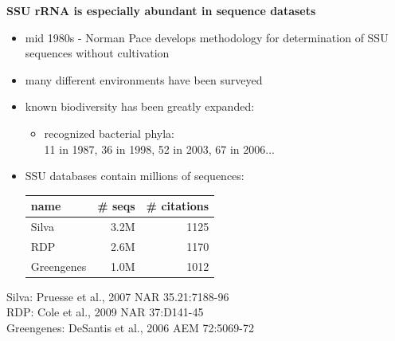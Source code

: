\documentclass[landscape]{slides}
\begin{document}
\begin{slide}
\begin{center}

\textbf{SSU rRNA is especially abundant in sequence datasets}
\end{center}
\medskip
\begin{minipage}{7in}
\small
\begin{itemize}
\item mid 1980s - Norman Pace develops methodology for determination
      of SSU sequences without cultivation
\item many different environments have been surveyed
\item known biodiversity has been greatly expanded:

\begin{itemize}
\item
  recognized bacterial phyla: \\
  11 in 1987, 36 in 1998, 52 in 2003, 67 in 2006...
\end{itemize}

\item SSU databases contain millions of sequences:
\begin{center}
\begin{tabular}{lrr}
  name & \# seqs & \# citations \\ \hline
  Silva & 3.2M & 1125 \\ 
  RDP   & 2.6M & 1170 \\
  Greengenes & 1.0M & 1012 \\
\end{tabular}
\end{center}
\end{itemize}

\tiny
Silva: Pruesse et al., 2007 NAR 35.21:7188-96 \\
RDP: Cole et al., 2009 NAR 37:D141-45 \\
Greengenes: DeSantis et al., 2006 AEM 72:5069-72 \\


\end{minipage}
\end{slide}
\end{document}
